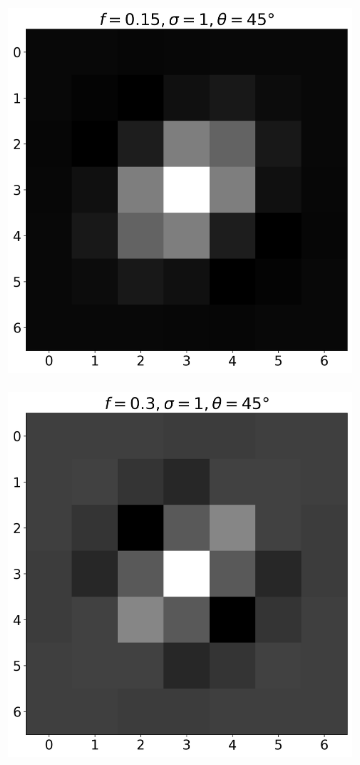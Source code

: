 \documentclass[12pt,a4paper, english]{article}
\begin{document}
\begin{figure}[!htbp]
      \begin{subfigure}[b]{0.3\textwidth}
        \includegraphics[width=\textwidth]{img/K3.png}
      \end{subfigure}
      \begin{subfigure}[b]{0.3\textwidth}
        \includegraphics[width=\textwidth]{img/K4.png}

\end{subfigure}
\end{figure}
\end{document}

